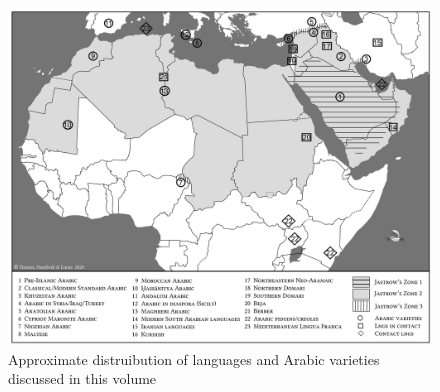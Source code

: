 \documentclass[output=paper]{langsci/langscibook}
\begin{document}
\begin{figure}
\includegraphics[width=\textwidth]{figures/intromap.jpg}
\caption{Approximate distruibution of languages and Arabic varieties discussed in this volume}
\label{intromap}
\end{figure}
\end{document}
